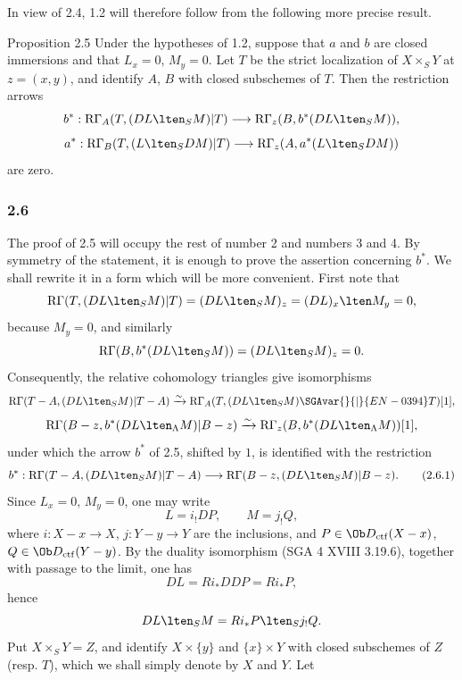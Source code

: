 In view of 2.4, 1.2 will therefore follow from the following more precise result.

\begin{statement}{Proposition 2.5}
Under the hypotheses of 1.2, suppose that $a$ and $b$ are closed immersions and that $L_x=0$, $M_y=0$. Let $T$ be the strict localization of $X\times_SY$ at $z=(x,y)$, and identify $A$, $B$ with closed subschemes of $T$. Then the restriction arrows
\[
b^*:\mathrm R\Gamma_A(T,(DL\lten_SM)|T)
 \longrightarrow \mathrm R\Gamma_z(B,b^*(DL\lten_SM)),
\]
\[
a^*:\mathrm R\Gamma_B(T,(L\lten_SDM)|T)
 \longrightarrow \mathrm R\Gamma_z(A,a^*(L\lten_SDM))
\]
are zero.
\end{statement}

\subsubsection*{2.6}
The proof of 2.5 will occupy the rest of number 2 and numbers 3 and 4. By symmetry of the statement, it is enough to prove the assertion concerning $b^*$. We shall rewrite it in a form which will be more convenient. First note that
\[
\mathrm R\Gamma(T,(DL\lten_SM)|T)
 =(DL\lten_SM)_z
 =(DL)_x\lten M_y=0,
\]
because $M_y=0$, and similarly
\[
\mathrm R\Gamma(B,b^*(DL\lten_SM))
 =(DL\lten_SM)_z=0.
\]
Consequently, the relative cohomology triangles give isomorphisms
\[
\mathrm R\Gamma(T-A,(DL\lten_SM)|T-A)
 \xrightarrow{\sim}
\mathrm R\Gamma_A(T,(DL\lten_SM)\SGAvar{}{|}{EN-0394}T)[1],
\]
\[
\mathrm R\Gamma(B-z,b^*(DL\lten_{\Lambda}M)|B-z)
 \xrightarrow{\sim}
\mathrm R\Gamma_z(B,b^*(DL\lten_{\Lambda}M))[1],
\]
under which the arrow $b^*$ of 2.5, shifted by $1$, is identified with the restriction
\begin{equation}
b^*:\mathrm R\Gamma(T-A,(DL\lten_SM)|T-A)
 \longrightarrow \mathrm R\Gamma(B-z,(DL\lten_SM)|B-z).
\tag{2.6.1}
\end{equation}
Since $L_x=0$, $M_y=0$, one may write
\begin{equation}
L=i_!DP,\qquad M=j_!Q,
\tag{2.6.2}
\end{equation}
where %
$i:X-x\to X$, $j:Y-y\to Y$ are the inclusions, and $P\in\Ob D_{\mathrm{ctf}}(X-x)$, $Q\in\Ob D_{\mathrm{ctf}}(Y-y)$. By the duality isomorphism (SGA 4 XVIII 3.19.6), together with passage to the limit, one has
\[
DL=Ri_*DDP=Ri_*P,
\]
hence
\[
DL\lten_SM=Ri_*P\lten_Sj_!Q.
\]
Put $X\times_SY=Z$, and identify $X\times\{y\}$ and $\{x\}\times Y$ with closed subschemes of $Z$ (resp. $T$), which we shall simply denote by $X$ and $Y$. Let
